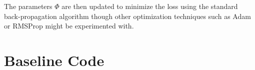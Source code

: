 \documentclass{article} %
\begin{document}
The parameters $\Phi$ are then updated to minimize the loss using the standard back-propagation algorithm
though other optimization techniques such as Adam or RMSProp might be experimented with.




\section{Baseline Code}
\end{document}
